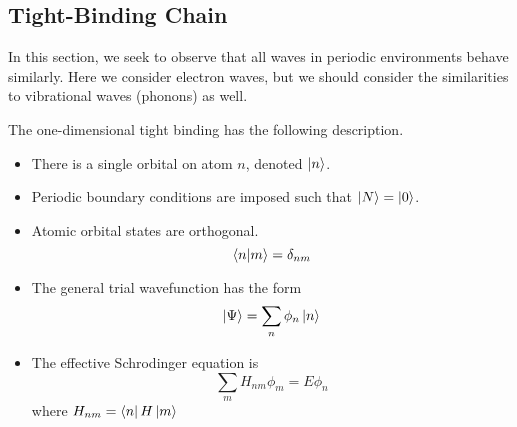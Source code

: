 \documentclass[10pt]{article}
\begin{document}
\subsection{Tight-Binding Chain}
In this section, we seek to observe that all waves in periodic environments behave similarly. Here
we consider electron waves, but we should consider the similarities to vibrational waves (phonons) as
well.

The one-dimensional tight binding has the following description.
\begin{itemize}
  \item There is a single orbital on atom $n$, denoted $\ket{n}$.
  \item Periodic boundary conditions are imposed such that $\ket{N} = \ket{0}$.
  \item Atomic orbital states are orthogonal.
  $$\bra{n}\ket{m} = \delta_{nm}$$
  \item The general trial wavefunction has the form
  $$\ket{\Psi} = \sum_{n}\phi_{n}\ket{n}$$
  \item The effective Schrodinger equation is
  $$
  \sum_{m}H_{nm}\phi_{m} = E\phi_{n}
  $$
  where $H_{nm} = \bra{n}H\ket{m}$
\end{itemize}
\end{document}

